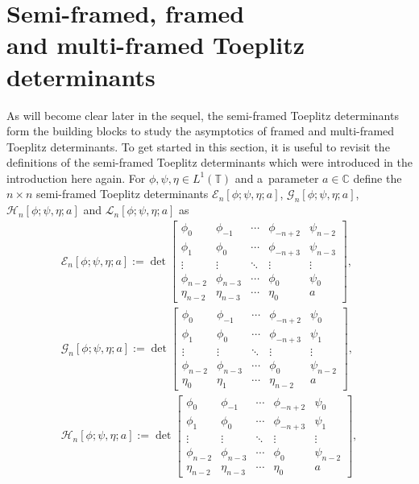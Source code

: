 \documentclass[10pt,a4paper]{amsart}
\numberwithin{equation}{section}
\newcommand{\C}{{\mathbb C}}
\newcommand{\T}{{\mathbb T}}
\begin{document}
\section[Semi-framed, framed and multi-framed Toeplitz determinants]{Semi-framed, framed \\
and multi-framed Toeplitz determinants}\label{section framed}
		As will become clear later in the sequel, the semi-framed Toeplitz determinants form the building blocks to study the asymptotics of framed and multi-framed Toeplitz determinants. To get started in this section, it is useful to revisit the definitions of the semi-framed Toeplitz determinants which were introduced in the introduction here again. For $\phi,\psi,\eta \in L^1(\T)$ and a~parameter $a \in \C$ define the $n\times n$ semi-framed Toeplitz determinants $\mathscr{E}_n[\phi;\psi,\eta;a]$, $\mathscr{G}_n[\phi;\psi,\eta;a]$, $\mathscr{H}_n[\phi;\psi,\eta;a]$ and $\mathscr{L}_n[\phi;\psi,\eta;a]$ as
		\begin{gather}%
			\mathscr{E}_n[\phi;\psi,\eta;a] := \det \begin{bmatrix}
				\phi_0& \phi_{-1} & \cdots & \phi_{-n+2} & \psi_{n-2} \\
				\phi_{1}& \phi_0 & \cdots & \phi_{-n+3} & \psi_{n-3} \\
				\vdots & \vdots & \ddots & \vdots & \vdots \\
				\phi_{n-2} & \phi_{n-3} & \cdots & \phi_{0} & \psi_{0} \\
				\eta_{n-2} & \eta_{n-3} & \cdots & \eta_{0} & a
			\end{bmatrix},\label{half-framed}
\\
			\mathscr{G}_n[\phi;\psi,\eta;a] := \det \begin{bmatrix}
				\phi_0& \phi_{-1} & \cdots & \phi_{-n+2} & \psi_{0} \\
				\phi_{1}& \phi_0 & \cdots & \phi_{-n+3} & \psi_{1} \\
				\vdots & \vdots & \ddots & \vdots & \vdots \\
				\phi_{n-2} & \phi_{n-3} & \cdots & \phi_{0} & \psi_{n-2} \\
				\eta_{0} & \eta_{1} & \cdots & \eta_{n-2} & a
			\end{bmatrix},
\\
			\mathscr{H}_n[\phi;\psi,\eta;a] := \det \begin{bmatrix}
				\phi_0& \phi_{-1} & \cdots & \phi_{-n+2} & \psi_{0} \\
				\phi_{1}& \phi_0 & \cdots & \phi_{-n+3} & \psi_{1} \\
				\vdots & \vdots & \ddots & \vdots & \vdots \\
				\phi_{n-2} & \phi_{n-3} & \cdots & \phi_{0} & \psi_{n-2} \\
				\eta_{n-2} & \eta_{n-3} & \cdots & \eta_{0} & a
			\end{bmatrix},\label{half-framed 2}
		\end{gather}
\end{document}
